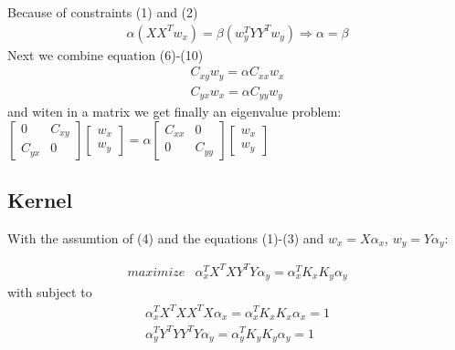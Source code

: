 \documentclass[a4paper, 12pt, titlepage]{article}
\begin{document}
Because of constraints (1) and (2) 
\begin{eqnarray}
  \alpha( XX^Tw_x )=\beta ( w^T_yYY^Tw_y)  \Rightarrow \alpha = \beta
\end{eqnarray}
Next we combine equation (6)-(10)
\begin{eqnarray}
  C_{xy}w_y = \alpha C_{xx}  w_x \\
  C_{yx}w_x = \alpha C_{yy}  w_y
\end{eqnarray}
and witen in a matrix we get finally an eigenvalue problem: \newline \newline
$
\begin{bmatrix} 0 & C_{xy} \\ C_{yx} & 0 \end{bmatrix}
\begin{bmatrix} w_x \\ w_y \end{bmatrix} =  \alpha
\begin{bmatrix} C_{xx} & 0 \\ 0 & C_{yy} \end{bmatrix}
\begin{bmatrix} w_x \\ w_y \end{bmatrix}
$
\newline \newline

\subsection{Kernel}
With the assumtion of (4) and the equations (1)-(3) and $w_x= X \alpha_x$, $w_y = Y \alpha_y$:

\begin{eqnarray}
  maximize & \alpha^T_xX^TXY^TY\alpha_y = \alpha^T_xK_xK_y\alpha_y
 \end{eqnarray}
with subject to
\begin{eqnarray}
  \alpha^T_xX^TXX^TX\alpha_x = \alpha^T_xK_xK_x\alpha_x = 1\\
  \alpha^T_yY^TYY^TY\alpha_y = \alpha^T_yK_yK_y\alpha_y = 1\\
\end{eqnarray}
\end{document}

